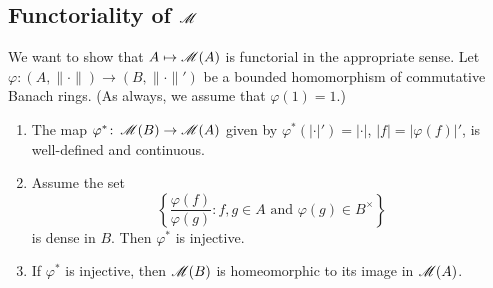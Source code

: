 \subsection{Functoriality of \texorpdfstring{$\operatorname{\mathscr{M}}$}{M}}

We want to show that $A\mapsto \operatorname{\mathscr{M}}(A)$ is functorial in the appropriate 
sense. Let $\varphi\colon (A,\|\cdot\|)\to (B,\|\cdot\|')$ be a bounded 
homomorphism of commutative Banach rings. (As always, we assume that 
$\varphi(1)=1$.)

\begin{theorem}
\leavevmode
\begin{enumerate}
\item
The map $\varphi^\ast\colon \operatorname{\mathscr{M}}(B)\to \operatorname{\mathscr{M}}(A)$ given by 
$\varphi^\ast(|\cdot|') = |\cdot|$, $|f| = |\varphi(f)|'$, is well-defined and 
continuous. 

\item
Assume the set 
\[
  \left\{\frac{\varphi(f)}{\varphi(g)}\colon f,g\in A\text{ and }\varphi(g)\in B^\times\right\} 
\]
is dense in $B$. Then $\varphi^\ast$ is injective. 

\item
If $\varphi^\ast$ is injective, then $\operatorname{\mathscr{M}}(B)$ is homeomorphic to its 
image in $\operatorname{\mathscr{M}}(A)$. 
\end{enumerate}
\end{theorem}

